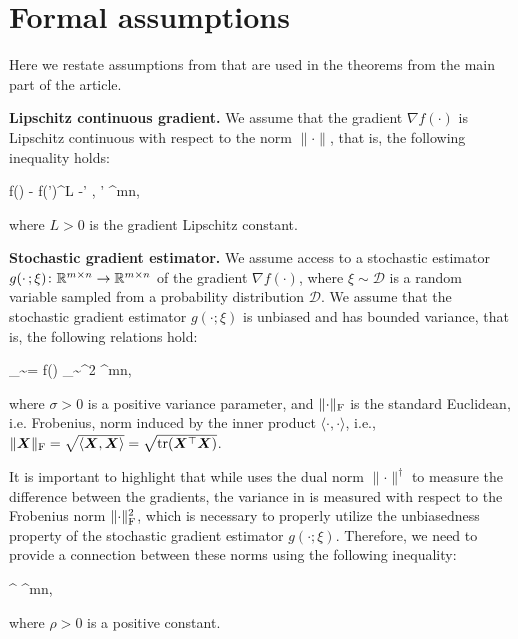 \documentclass{article} %
\newcommand{\norm}[1]{\lVert #1\rVert}
\newcommand{\Rmn}{\R^{m\times n}}
\newcommand{\cD}{\mathcal{D}}
\newcommand{\Ed}[2]{\mathbb{E}_{#1}\left[#2\right]}
\DeclarePairedDelimiter{\normf}{\|}{\|_\mathrm{F}}
\DeclarePairedDelimiter{\sqnf}{\|}{\|_{\mathrm{F}}^2}
\def\<#1,#2>{\langle #1,#2\rangle}
\newcounter{aequation}
\DeclareMathOperator{\tr}{tr}
\begin{document}



\appendix

\section{Formal assumptions}
Here we restate assumptions from \citet{kovalev2025understanding} that are used in the theorems from the main part of the article.

{\bf Lipschitz continuous gradient.}
    We assume that the gradient $\nabla f(\cdot)$ is Lipschitz continuous with respect to the norm $\norm{\cdot}$, that is, the following inequality holds:
    \begin{aequation}\label{eq:L}
    \norm{\nabla f(\mX) - \nabla f(\mX')}^\dagger \leq L \norm{\mX-\mX'}
    \quad{}\;
    \mX, \mX' \in \Rmn,
    \end{aequation}
    where $L > 0$ is the gradient Lipschitz constant.

{\bf Stochastic gradient estimator.}
    We assume access to a stochastic estimator $g(\cdot\,;\xi)\colon \Rmn \to \Rmn$ of the gradient $\nabla f(\cdot)$, where $\xi \sim \cD$ is a random variable sampled from a probability distribution $\cD$. We assume that the stochastic gradient estimator $g(\cdot;\xi)$ is unbiased and has bounded variance, that is, the following relations hold:
    \begin{aequation}\label{eq:variance}
    \Ed{\xi \sim \cD}{g(\mX;\xi)} = \nabla f(\mX)
    \quad{}\quad
    \Ed{\xi \sim \cD}{\sqnf{g(\mX;\xi) - \nabla f(\mX)}} \leq \sigma^2
    \quad{}\;
    \mX \in \Rmn,
    \end{aequation}
    where $\sigma > 0$ is a positive variance parameter, and $\normf{\cdot}$ is the standard Euclidean, i.e. Frobenius, norm induced by the inner product $\<\cdot,\cdot>$, i.e., $\normf{\mX} = \sqrt{\<\mX,\mX>}=\sqrt{\tr(\mX^\top \mX)}$.

    It is important to highlight that while  uses the dual norm $\norm{\cdot}^\dagger$ to measure the difference between the gradients, the variance in  is measured with respect to the Frobenius norm $\sqnf{\cdot}$, which is necessary to properly utilize the unbiasedness property of the stochastic gradient estimator $g(\cdot;\xi)$. Therefore, we need to provide a connection between these norms using the following inequality:
    \begin{aequation}\label{eq:norm}
    \norm{\mX}^\dagger \leq \rho\cdot\normf{\mX}
    \quad{}\;
    \mX \in \Rmn,
    \end{aequation}
    where $\rho > 0$ is a positive constant.
\end{document}
